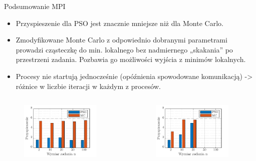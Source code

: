 \documentclass[handout]{beamer}
\begin{document}
\begin{frame}{Podsumowanie MPI}
\begin{itemize}
\item Przyspieszenie dla PSO jest znacznie mniejsze niż  dla Monte Carlo.
\item Zmodyfikowane Monte Carlo z odpowiednio dobranymi parametrami prowadzi cząsteczkę do min. lokalnego bez nadmiernego „skakania” po przestrzeni zadania. Pozbawia go możliwości wyjścia z minimów lokalnych.
\item Procesy nie startują jednocześnie (opóźnienia spowodowane komunikacją) -> różnice w liczbie iteracji w każdym z procesów.
\end{itemize}
\vspace{-.6cm}
\begin{columns}
\begin{column}[t]{0.5\textwidth}

\begin{figure}[t]
\includegraphics[width=0.9\textwidth]{grafiki/przyspieszenieMPI1.pdf}
\end{figure}

\end{column}
\begin{column}[t]{0.5\textwidth}

\begin{figure}[t]
\includegraphics[width=0.9\textwidth]{grafiki/przyspieszenieMPI2.pdf}
\end{figure}


\end{column}
\end{columns}
\end{frame}
\end{document}
